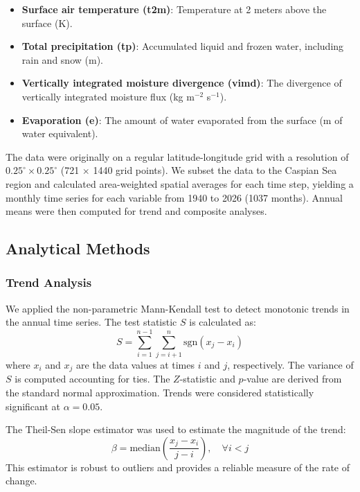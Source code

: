 \documentclass[12pt,a4paper]{article}
\begin{document}
\begin{itemize}
    \item \textbf{Surface air temperature (t2m)}: Temperature at 2 meters above the surface (K).
    \item \textbf{Total precipitation (tp)}: Accumulated liquid and frozen water, including rain and snow (m).
    \item \textbf{Vertically integrated moisture divergence (vimd)}: The divergence of vertically integrated moisture flux (kg m$^{-2}$ s$^{-1}$).
    \item \textbf{Evaporation (e)}: The amount of water evaporated from the surface (m of water equivalent).
\end{itemize}

The data were originally on a regular latitude-longitude grid with a resolution of $0.25^\circ \times 0.25^\circ$ (721 $\times$ 1440 grid points). We subset the data to the Caspian Sea region and calculated area-weighted spatial averages for each time step, yielding a monthly time series for each variable from 1940 to 2026 (1037 months). Annual means were then computed for trend and composite analyses.

\subsection{Analytical Methods}

\subsubsection{Trend Analysis}
We applied the non-parametric Mann-Kendall test \citep{mann1945,kendall1975} to detect monotonic trends in the annual time series. The test statistic $S$ is calculated as:
\begin{equation}
S = \sum_{i=1}^{n-1} \sum_{j=i+1}^{n} \text{sgn}(x_j - x_i)
\end{equation}
where $x_i$ and $x_j$ are the data values at times $i$ and $j$, respectively. The variance of $S$ is computed accounting for ties. The $Z$-statistic and $p$-value are derived from the standard normal approximation. Trends were considered statistically significant at $\alpha = 0.05$.

The Theil-Sen slope estimator \citep{theil1950,sen1968} was used to estimate the magnitude of the trend:
\begin{equation}
\beta = \text{median}\left(\frac{x_j - x_i}{j - i}\right), \quad \forall i < j
\end{equation}
This estimator is robust to outliers and provides a reliable measure of the rate of change.
\end{document}

